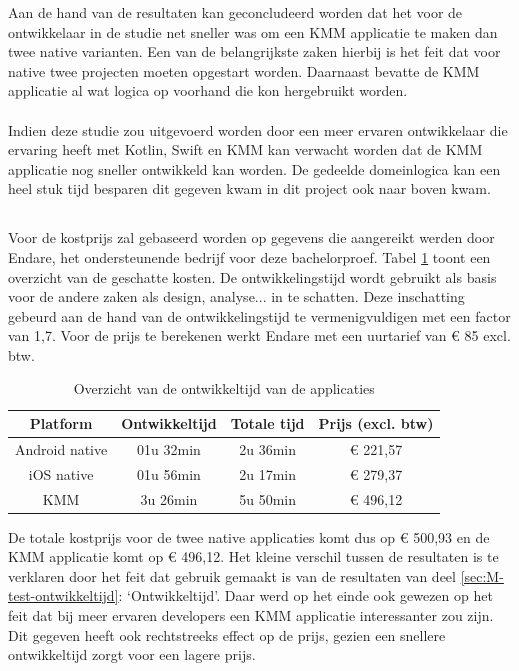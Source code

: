 Aan de hand van de resultaten kan geconcludeerd worden dat het voor de ontwikkelaar in de studie net sneller was om een KMM applicatie te maken dan twee native varianten. Een van de belangrijkste zaken hierbij is het feit dat voor native twee projecten moeten opgestart worden. Daarnaast bevatte de KMM applicatie al wat logica op voorhand die kon hergebruikt worden.
\\ \\ 
Indien deze studie zou uitgevoerd worden door een meer ervaren ontwikkelaar die ervaring heeft met Kotlin, Swift en KMM kan verwacht worden dat de KMM applicatie nog sneller ontwikkeld kan worden. De gedeelde domeinlogica kan een heel stuk tijd besparen dit gegeven kwam in dit project ook naar boven kwam.

\subsection{}
\label{sec:M-test-lijnen-kostprijs}
Voor de kostprijs zal gebaseerd worden op gegevens die aangereikt werden door Endare, het ondersteunende bedrijf voor deze bachelorproef. Tabel \ref{T:prijzen-overzicht} toont een overzicht van de geschatte kosten. De ontwikkelingstijd wordt gebruikt als basis voor de andere zaken als design, analyse... in te schatten. Deze inschatting gebeurd aan de hand van de ontwikkelingstijd te vermenigvuldigen met een factor van 1,7. Voor de prijs te berekenen werkt Endare met een uurtarief van \euro{} 85 excl. btw.

\begin{table}[H]
    \centering
    \caption{Overzicht van de ontwikkeltijd van de applicaties}
    \begin{tabular}{|c|c|c|c|}
        \hline
        {\textbf{Platform}} & {\textbf{Ontwikkeltijd}}& {\textbf{Totale tijd}}& {\textbf{Prijs (excl. btw)}}\\ \hline \hline
        Android native&01u 32min&2u 36min&\euro{} 221,57\\ \hline
        iOS native&01u 56min&2u 17min&\euro{} 279,37\\ \hline
        KMM&3u 26min&5u 50min&\euro{} 496,12\\ \hline
    \end{tabular}
    \label{T:prijzen-overzicht}
\end{table}

De totale kostprijs voor de twee native applicaties komt dus op \euro{} 500,93 en de KMM applicatie komt op \euro{} 496,12. Het kleine verschil tussen de resultaten is te verklaren door het feit dat gebruik gemaakt is van de resultaten van deel \ref{sec:M-test-ontwikkeltijd}: `Ontwikkeltijd'. Daar werd op het einde ook gewezen op het feit dat bij meer ervaren developers een KMM applicatie interessanter zou zijn. Dit gegeven heeft ook rechtstreeks effect op de prijs, gezien een snellere ontwikkeltijd zorgt voor een lagere prijs.

